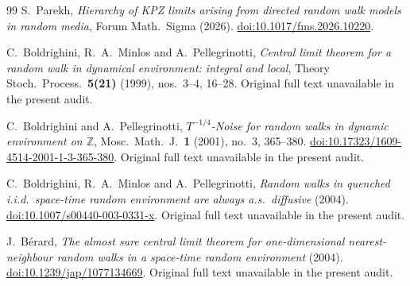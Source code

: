 \documentclass[11pt]{article}
\newcommand{\ZZ}{\mathbb Z}
\begin{document}
\begin{thebibliography}{99}
S.~Parekh,
\emph{Hierarchy of KPZ limits arising from directed random walk
models in random media},
Forum Math.\ Sigma (2026).
\href{https://doi.org/10.1017/fms.2026.10220}
     {doi:10.1017/fms.2026.10220}.

C.~Boldrighini, R.~A.~Minlos and A.~Pellegrinotti,
\emph{Central limit theorem for a random walk in dynamical
environment: integral and local},
Theory Stoch.\ Process.\ \textbf{5(21)} (1999), nos.~3--4, 16--28.
Original full text unavailable in the present audit.

C.~Boldrighini and A.~Pellegrinotti,
\emph{$T^{-1/4}$-Noise for random walks in dynamic environment on $\ZZ$},
Mosc.\ Math.\ J.\ \textbf{1} (2001), no.~3, 365--380.
\href{https://doi.org/10.17323/1609-4514-2001-1-3-365-380}
     {doi:10.17323/1609-4514-2001-1-3-365-380}.
Original full text unavailable in the present audit.

C.~Boldrighini, R.~A.~Minlos and A.~Pellegrinotti,
\emph{Random walks in quenched i.i.d.\ space-time random environment
are always a.s.\ diffusive} (2004).
\href{https://doi.org/10.1007/s00440-003-0331-x}
     {doi:10.1007/s00440-003-0331-x}.
Original full text unavailable in the present audit.

J.~B\'erard,
\emph{The almost sure central limit theorem for one-dimensional
nearest-neighbour random walks in a space-time random environment}
(2004).
\href{https://doi.org/10.1239/jap/1077134669}
     {doi:10.1239/jap/1077134669}.
Original full text unavailable in the present audit.
\end{thebibliography}
\end{document}
